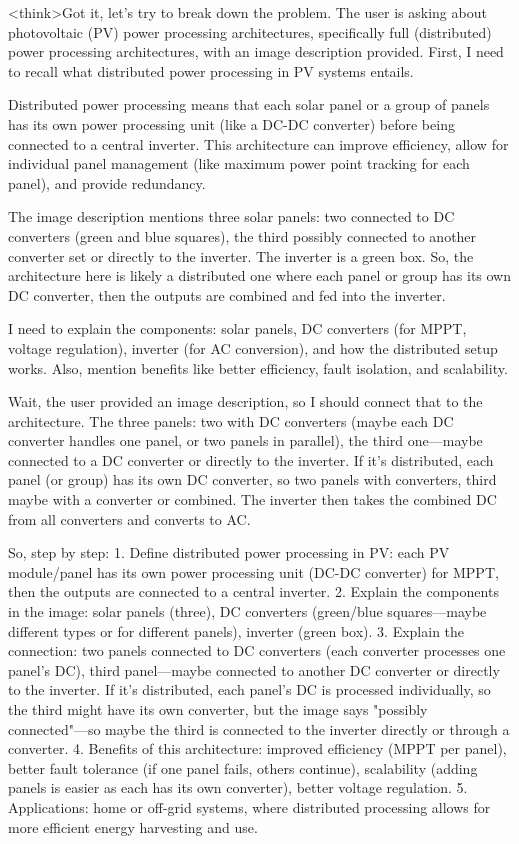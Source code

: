 <think>Got it, let's try to break down the problem. The user is asking about photovoltaic (PV) power processing architectures, specifically full (distributed) power processing architectures, with an image description provided. First, I need to recall what distributed power processing in PV systems entails. 

Distributed power processing means that each solar panel or a group of panels has its own power processing unit (like a DC-DC converter) before being connected to a central inverter. This architecture can improve efficiency, allow for individual panel management (like maximum power point tracking for each panel), and provide redundancy. 

The image description mentions three solar panels: two connected to DC converters (green and blue squares), the third possibly connected to another converter set or directly to the inverter. The inverter is a green box. So, the architecture here is likely a distributed one where each panel or group has its own DC converter, then the outputs are combined and fed into the inverter. 

I need to explain the components: solar panels, DC converters (for MPPT, voltage regulation), inverter (for AC conversion), and how the distributed setup works. Also, mention benefits like better efficiency, fault isolation, and scalability. 

Wait, the user provided an image description, so I should connect that to the architecture. The three panels: two with DC converters (maybe each DC converter handles one panel, or two panels in parallel), the third one—maybe connected to a DC converter or directly to the inverter. If it's distributed, each panel (or group) has its own DC converter, so two panels with converters, third maybe with a converter or combined. The inverter then takes the combined DC from all converters and converts to AC. 

So, step by step: 
1. Define distributed power processing in PV: each PV module/panel has its own power processing unit (DC-DC converter) for MPPT, then the outputs are connected to a central inverter. 
2. Explain the components in the image: solar panels (three), DC converters (green/blue squares—maybe different types or for different panels), inverter (green box). 
3. Explain the connection: two panels connected to DC converters (each converter processes one panel's DC), third panel—maybe connected to another DC converter or directly to the inverter. If it's distributed, each panel's DC is processed individually, so the third might have its own converter, but the image says "possibly connected"—so maybe the third is connected to the inverter directly or through a converter. 
4. Benefits of this architecture: improved efficiency (MPPT per panel), better fault tolerance (if one panel fails, others continue), scalability (adding panels is easier as each has its own converter), better voltage regulation. 
5. Applications: home or off-grid systems, where distributed processing allows for more efficient energy harvesting and use. 

